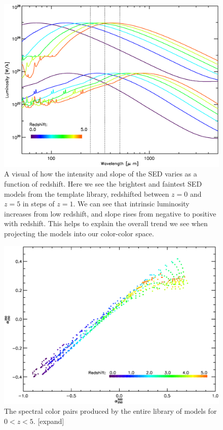 \documentclass[twocolumn,letterpaper,10pt]{article}
\begin{document}
\begin{figure}
\includegraphics[width=\textwidth]{model_brightness.eps}
\caption{A visual of how the intensity and slope of the SED varies as a function of redshift. Here we see the brightest and faintest SED models from the \citet{rieke09} template library, redshifted between $z=0$ and $z=5$ in steps of $z=1$. We can see that intrinsic luminosity increases from low redshift, and slope rises from negative to positive with redshift. This helps to explain the overall trend we see when projecting the models into our color-color space.}
\label{mshift}
\end{figure}

\begin{figure}
  \includegraphics[width=\textwidth]{model_colors.eps}
  \caption{The spectral color pairs produced by the entire library of models for $0<z<5$. [expand]}
  \label{slib_color}
\end{figure}
\end{document}
